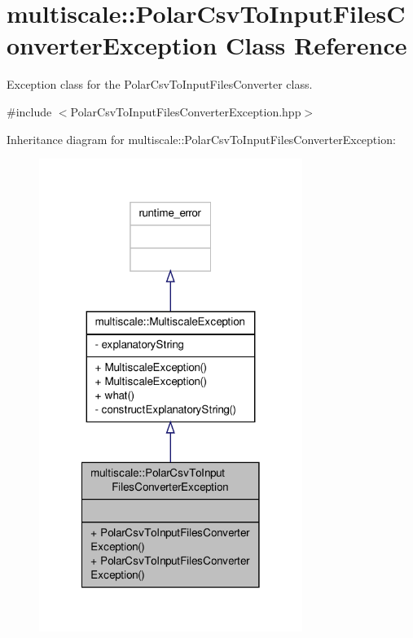 \hypertarget{classmultiscale_1_1PolarCsvToInputFilesConverterException}{\section{multiscale\-:\-:Polar\-Csv\-To\-Input\-Files\-Converter\-Exception Class Reference}
\label{classmultiscale_1_1PolarCsvToInputFilesConverterException}
}


Exception class for the Polar\-Csv\-To\-Input\-Files\-Converter class.  




{\ttfamily \#include $<$Polar\-Csv\-To\-Input\-Files\-Converter\-Exception.\-hpp$>$}



Inheritance diagram for multiscale\-:\-:Polar\-Csv\-To\-Input\-Files\-Converter\-Exception\-:
\nopagebreak
\begin{figure}[H]
\begin{center}
\leavevmode
\includegraphics[width=242pt]{classmultiscale_1_1PolarCsvToInputFilesConverterException__inherit__graph}
\end{center}
\end{figure}


